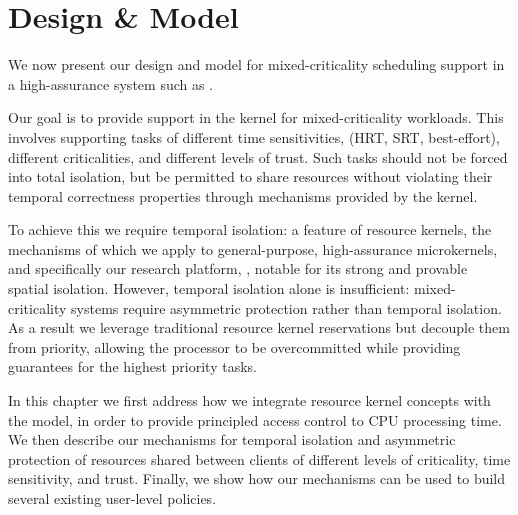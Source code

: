 \chapter{Design \& Model}
\label{chap:model}

We now present our design and model for mixed-criticality scheduling support in a high-assurance
system such as \selfour. 

Our goal is to provide support in the kernel for mixed-criticality workloads.  This involves
supporting tasks of different time sensitivities, (\gls{HRT}, \gls{SRT}, best-effort), different
criticalities, and different levels of trust.  Such tasks should not be forced into total
isolation, but be permitted to share resources without violating their temporal correctness
properties through mechanisms provided by the kernel.

To achieve this we require temporal isolation: a feature of resource kernels, the mechanisms of
which we apply to general-purpose, high-assurance microkernels, and specifically our research platform,
\selfour, notable for its strong and provable spatial isolation.
However, temporal isolation alone is insufficient: mixed-criticality
systems require asymmetric protection rather than temporal isolation. As a result we leverage
traditional resource kernel reservations but decouple them from priority, allowing the processor to
be overcommitted while providing guarantees for the highest priority tasks.

In this chapter we first address how we integrate resource kernel concepts with the \selfour model,
in order to provide principled access control to CPU processing time. 
We then describe our mechanisms for temporal isolation and asymmetric protection of
resources shared between clients of different levels of criticality, time sensitivity, and trust.
Finally, we show how our mechanisms can be used to build several existing user-level policies. 


